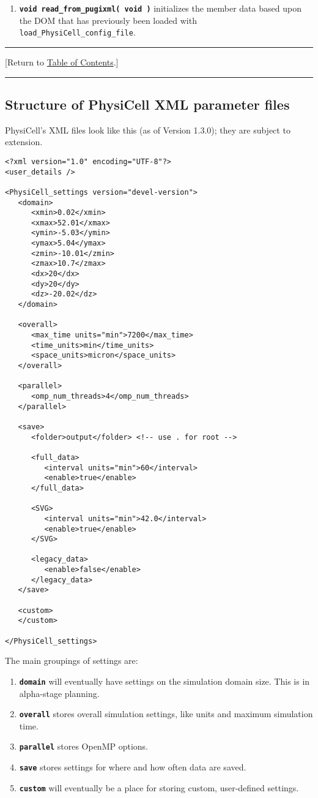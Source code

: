 \documentclass[12pt]{article}
\renewcommand{\v}{\verb}
\newcommand{\smallcode}[1]{\textbf{\texttt{#1}}}
\newcommand{\TOClink}{\begin{center}\hrule\vskip-10pt\phantom{.}\hfill[Return to \hyperlink{TOC}{Table of Contents}.]\hfill\phantom{.}\vskip3pt\hrule\end{center}}
\begin{document}
\begin{enumerate}
\item 
\smallcode{void read\_from\_pugixml( void )} initializes the member data 
based upon the DOM that has previously been loaded with 
\v|load_PhysiCell_config_file|. 

\end{enumerate}

\TOClink 


\subsection{Structure of PhysiCell XML parameter files}
\label{sec:XML_PhysiCell_structure}
PhysiCell's XML files look like this (as of Version 1.3.0); they 
are subject to extension. 

\begin{verbatim}
<?xml version="1.0" encoding="UTF-8"?>
<user_details />

<PhysiCell_settings version="devel-version">
   <domain>
      <xmin>0.02</xmin>
      <xmax>52.01</xmax>
      <ymin>-5.03</ymin>
      <ymax>5.04</ymax>
      <zmin>-10.01</zmin>
      <zmax>10.7</zmax>
      <dx>20</dx>
      <dy>20</dy>
      <dz>-20.02</dz>
   </domain>
   
   <overall>
      <max_time units="min">7200</max_time>  
      <time_units>min</time_units>
      <space_units>micron</space_units>
   </overall>
   
   <parallel>
      <omp_num_threads>4</omp_num_threads>
   </parallel> 
   
   <save>
      <folder>output</folder> <!-- use . for root --> 

      <full_data>
         <interval units="min">60</interval>
         <enable>true</enable>
      </full_data>
      
      <SVG>
         <interval units="min">42.0</interval>
         <enable>true</enable>
      </SVG>
      
      <legacy_data>
         <enable>false</enable>
      </legacy_data>
   </save>
   
   <custom>
   </custom>

</PhysiCell_settings>
\end{verbatim}

The main groupings of settings are: 
\begin{enumerate}
\item
\smallcode{domain} will eventually have settings on the simulation domain size. 
This is in alpha-stage planning. 

\item
\smallcode{overall} stores overall simulation settings, like units 
and maximum simulation time. 

\item 
\smallcode{parallel} stores OpenMP options. 

\item 
\smallcode{save} stores settings for where and how often data are saved. 

\item 
\smallcode{custom} will eventually be a place for storing custom, 
user-defined settings. 
\end{enumerate}
\end{document}
